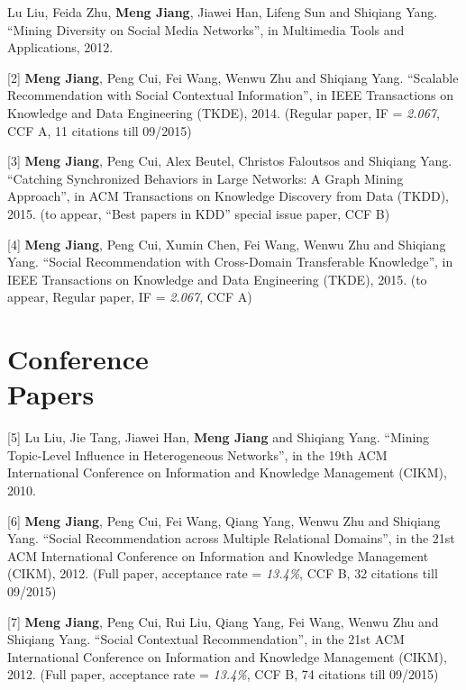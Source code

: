 \documentclass[margin, 10pt]{res} %
\begin{document}
\begin{resume}
[1] Lu Liu, Feida Zhu, {\bf Meng Jiang}, Jiawei Han, Lifeng Sun and Shiqiang Yang. ``Mining Diversity on Social Media Networks'', in Multimedia Tools and Applications, 2012.

[2] {\bf Meng Jiang}, Peng Cui, Fei Wang, Wenwu Zhu and Shiqiang Yang. ``Scalable Recommendation with Social Contextual Information'', in IEEE Transactions on Knowledge and Data Engineering (TKDE), 2014. (Regular paper, IF = {\em 2.067}, CCF A, 11 citations till 09/2015)

[3] {\bf Meng Jiang}, Peng Cui, Alex Beutel, Christos Faloutsos and Shiqiang Yang. ``Catching Synchronized Behaviors in Large Networks: A Graph Mining Approach'', in ACM Transactions on Knowledge Discovery from Data (TKDD), 2015. (to appear, ``Best papers in KDD'' special issue paper, CCF B)

[4] {\bf Meng Jiang}, Peng Cui, Xumin Chen, Fei Wang, Wenwu Zhu and Shiqiang Yang. ``Social Recommendation with Cross-Domain Transferable Knowledge'', in IEEE Transactions on Knowledge and Data Engineering (TKDE), 2015. (to appear, Regular paper, IF = {\em 2.067}, CCF A)


\section{Conference \\ Papers}

[5] Lu Liu, Jie Tang, Jiawei Han, {\bf Meng Jiang} and Shiqiang Yang. ``Mining Topic-Level Influence in Heterogeneous Networks'', in the 19th ACM International Conference on Information and Knowledge Management (CIKM), 2010.

[6] {\bf Meng Jiang}, Peng Cui, Fei Wang, Qiang Yang, Wenwu Zhu and Shiqiang Yang. ``Social Recommendation across Multiple Relational Domains'', in the 21st ACM International Conference on Information and Knowledge Management (CIKM), 2012. (Full paper, acceptance rate = {\em 13.4\%}, CCF B, 32 citations till 09/2015)

[7] {\bf Meng Jiang}, Peng Cui, Rui Liu, Qiang Yang, Fei Wang, Wenwu Zhu and Shiqiang Yang. ``Social Contextual Recommendation'', in the 21st ACM International Conference on Information and Knowledge Management (CIKM), 2012. (Full paper, acceptance rate = {\em 13.4\%}, CCF B, 74 citations till 09/2015)


\end{resume}
\end{document}
